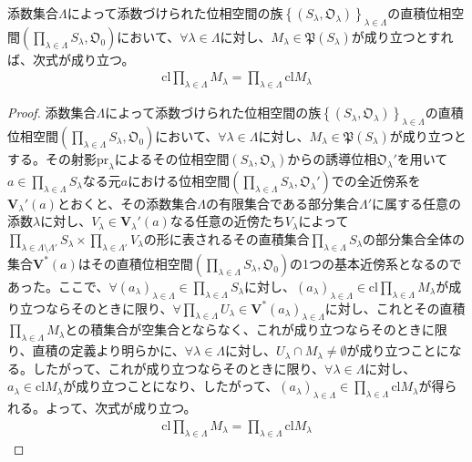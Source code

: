\documentclass[dvipdfmx]{jsarticle}
\begin{document}
\begin{thm}\label{8.1.4.20}
添数集合$\varLambda$によって添数づけられた位相空間の族$\left\{ \left( S_{\lambda},\mathfrak{O}_{\lambda} \right) \right\}_{\lambda \in \varLambda}$の直積位相空間$\left( \prod_{\lambda \in \varLambda} S_{\lambda},\mathfrak{O}_{0} \right)$において、$\forall\lambda \in \varLambda$に対し、$M_{\lambda}\in \mathfrak{P}\left( S_{\lambda} \right)$が成り立つとすれば、次式が成り立つ。
\begin{align*}
{\mathrm{cl}}{\prod_{\lambda \in \varLambda} M_{\lambda}} = \prod_{\lambda \in \varLambda} {{\mathrm{cl}}M_{\lambda}}
\end{align*}
\end{thm}
\begin{proof}
添数集合$\varLambda$によって添数づけられた位相空間の族$\left\{ \left( S_{\lambda},\mathfrak{O}_{\lambda} \right) \right\}_{\lambda \in \varLambda}$の直積位相空間$\left( \prod_{\lambda \in \varLambda} S_{\lambda},\mathfrak{O}_{0} \right)$において、$\forall\lambda \in \varLambda$に対し、$M_{\lambda}\in \mathfrak{P}\left( S_{\lambda} \right)$が成り立つとする。その射影${\mathrm{pr}}_{\lambda}$によるその位相空間$\left( S_{\lambda},\mathfrak{O}_{\lambda} \right)$からの誘導位相$\mathfrak{O}_{\lambda}'$を用いて$a \in \prod_{\lambda \in \varLambda} S_{\lambda}$なる元$a$における位相空間$\left( \prod_{\lambda \in \varLambda} S_{\lambda},\mathfrak{O}_{\lambda}' \right)$での全近傍系を$\mathbf{V}_{\lambda}'(a)$とおくと、その添数集合$\varLambda$の有限集合である部分集合$\varLambda'$に属する任意の添数$\lambda$に対し、$V_{\lambda} \in \mathbf{V}_{\lambda}'(a)$なる任意の近傍たち$V_{\lambda}$によって$\prod_{\lambda \in \varLambda \setminus \varLambda'} S_{\lambda} \times \prod_{\lambda \in \varLambda'} V_{\lambda}$の形に表されるその直積集合$\prod_{\lambda \in \varLambda} S_{\lambda}$の部分集合全体の集合$\mathbf{V}^{*}(a)$はその直積位相空間$\left( \prod_{\lambda \in \varLambda} S_{\lambda},\mathfrak{O}_{0} \right)$の1つの基本近傍系となるのであった。ここで、$\forall\left( a_{\lambda} \right)_{\lambda \in \varLambda} \in \prod_{\lambda \in \varLambda} S_{\lambda}$に対し、$\left( a_{\lambda} \right)_{\lambda \in \varLambda} \in {\mathrm{cl}}{\prod_{\lambda \in \varLambda} M_{\lambda}}$が成り立つならそのときに限り、$\forall\prod_{\lambda \in \varLambda} U_{\lambda} \in \mathbf{V}^{*}\left( a_{\lambda} \right)_{\lambda \in \varLambda}$に対し、これとその直積$\prod_{\lambda \in \varLambda} M_{\lambda}$との積集合が空集合とならなく、これが成り立つならそのときに限り、直積の定義より明らかに、$\forall\lambda \in \varLambda$に対し、$U_{\lambda} \cap M_{\lambda} \neq \emptyset$が成り立つことになる。したがって、これが成り立つならそのときに限り、$\forall\lambda \in \varLambda$に対し、$a_{\lambda} \in {\mathrm{cl}}M_{\lambda}$が成り立つことになり、したがって、$\left( a_{\lambda} \right)_{\lambda \in \varLambda} \in \prod_{\lambda \in \varLambda} {{\mathrm{cl}}M_{\lambda}}$が得られる。よって、次式が成り立つ。
\begin{align*}
{\mathrm{cl}}{\prod_{\lambda \in \varLambda} M_{\lambda}} = \prod_{\lambda \in \varLambda} {{\mathrm{cl}}M_{\lambda}}
\end{align*}
\end{proof}
\end{document}
